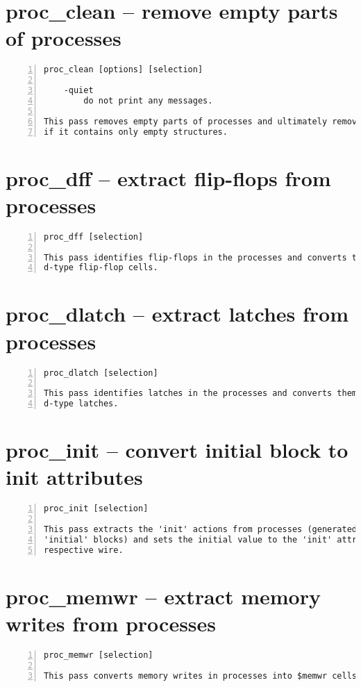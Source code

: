 \section{proc\_clean -- remove empty parts of processes}
\label{cmd:proc_clean}
\begin{lstlisting}[numbers=left,frame=single]
    proc_clean [options] [selection]

    -quiet
        do not print any messages.

This pass removes empty parts of processes and ultimately removes a process
if it contains only empty structures.
\end{lstlisting}

\section{proc\_dff -- extract flip-flops from processes}
\label{cmd:proc_dff}
\begin{lstlisting}[numbers=left,frame=single]
    proc_dff [selection]

This pass identifies flip-flops in the processes and converts them to
d-type flip-flop cells.
\end{lstlisting}

\section{proc\_dlatch -- extract latches from processes}
\label{cmd:proc_dlatch}
\begin{lstlisting}[numbers=left,frame=single]
    proc_dlatch [selection]

This pass identifies latches in the processes and converts them to
d-type latches.
\end{lstlisting}

\section{proc\_init -- convert initial block to init attributes}
\label{cmd:proc_init}
\begin{lstlisting}[numbers=left,frame=single]
    proc_init [selection]

This pass extracts the 'init' actions from processes (generated from Verilog
'initial' blocks) and sets the initial value to the 'init' attribute on the
respective wire.
\end{lstlisting}

\section{proc\_memwr -- extract memory writes from processes}
\label{cmd:proc_memwr}
\begin{lstlisting}[numbers=left,frame=single]
    proc_memwr [selection]

This pass converts memory writes in processes into $memwr cells.
\end{lstlisting}

